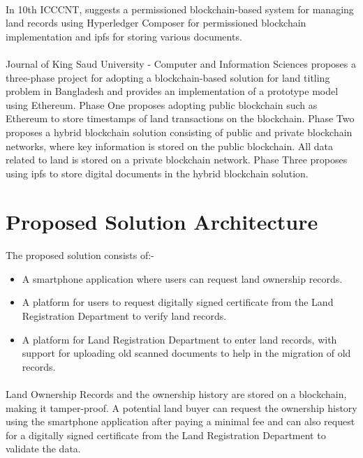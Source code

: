\documentclass[12pt]{article}
\begin{document}
        \paragraph{}
        In 10th ICCCNT, \cite{8944471} suggests a permissioned blockchain-based system for managing land records using Hyperledger Composer for permissioned blockchain implementation and \acrshort{ipfs} for storing various documents.

        \paragraph{}
        Journal of King Saud University - Computer and Information Sciences \cite{ALAM2020} proposes a three-phase project for adopting a blockchain-based solution for land titling problem in Bangladesh and provides an implementation of a prototype model using Ethereum. Phase One proposes adopting public blockchain such as Ethereum to store timestamps of land transactions on the blockchain. Phase Two proposes a hybrid blockchain solution consisting of public and private blockchain networks, where key information is stored on the public blockchain. All data related to land is stored on a private blockchain network. Phase Three proposes using \acrshort{ipfs} to store digital documents in the hybrid blockchain solution.



\section{Proposed Solution Architecture}
    \paragraph{}
    The proposed solution consists of:-

    \begin{itemize}
        \item A smartphone application where users can request land ownership records.
        \item A platform for users to request digitally signed certificate from the Land Registration Department to verify land records.
        \item A platform for Land Registration Department to enter land records, with support for uploading old scanned documents to help in the migration of old records.
    \end{itemize}

    \paragraph{}
    Land Ownership Records and the ownership history are stored on a blockchain, making it tamper-proof. A potential land buyer can request the ownership history using the smartphone application after paying a minimal fee and can also request for a digitally signed certificate from the Land Registration Department to validate the data.
\end{document}
